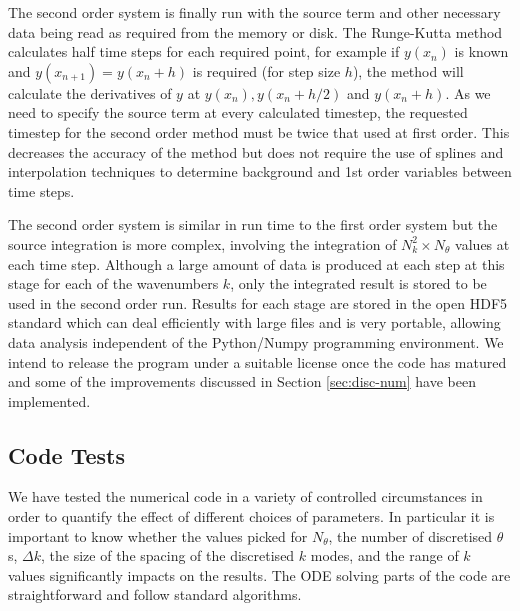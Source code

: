 The second order system is finally run with the source term and other
necessary data being read as required from the memory or disk. The
Runge-Kutta method calculates half time steps for each required point,
for example if $y(x_n)$ is known and $y(x_{n+1})=y(x_n+h)$ is required
(for step size $h$), the method will calculate the derivatives of $y$
at $y(x_n), y(x_n +h/2)$ and $y(x_n + h)$. As we need to specify the
source term at every calculated timestep, the requested timestep for
the second order method must be twice that used at first order.  This decreases the
accuracy of the method but does not require the use
of splines and interpolation techniques to determine background and
1st order variables between time steps.


The second order system is similar in run time to the first order 
system but the
source integration is more complex, involving the
integration of $N_k^2\times N_\theta$ values at
each time step.
Although a large amount of data is produced at each step at this
stage for 
each of the wavenumbers $k$, only the integrated result is stored to be used
in the second order run.
Results for each stage are stored in the open HDF5 standard which can deal
efficiently with large
files and is very portable, allowing data analysis independent of the
Python/Numpy programming environment.
We intend to release the program under a suitable license once the code has
matured and some of the improvements discussed in Section \ref{sec:disc-num} have
been implemented.


\subsection{Code Tests}
\label{sec:codetests}


We have tested the numerical code in a variety of controlled
circumstances in order to quantify the effect of different choices of
parameters. In particular it is important to know whether the values
picked for $N_\theta$, the number of discretised $\theta$s, $\Delta k$, the size of the
spacing of the discretised $k$ modes, and the range of
$k$ values significantly impacts on the results. The ODE solving parts
of the code are straightforward and follow standard algorithms.


